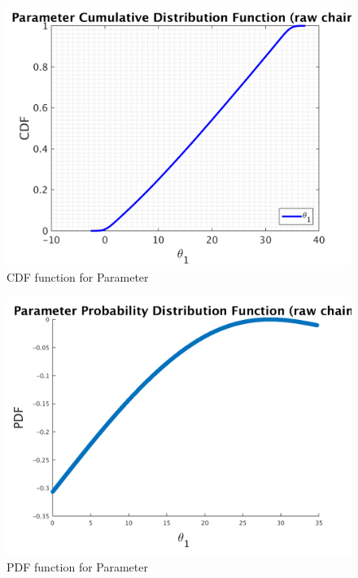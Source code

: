 \begin{figure}[h!]
  
  \centering
   \includegraphics[scale=0.75]{output_1000000/simple_ip_cdf_raw}
   \caption{CDF function for Parameter }
\end{figure}



\begin{figure}[h!]
  
  \centering
   \includegraphics[scale=0.75]{output_1000000/ip_logLike_unified}
   \caption{PDF function for Parameter }
\end{figure}

